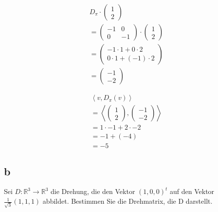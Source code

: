 \begin{align*}
    D_\pi \cdot \begin{pmatrix}
        1 \\ 2
    \end{pmatrix} \\
    = \begin{pmatrix}
        -1 & 0 \\ 0 & -1
    \end{pmatrix} \cdot \begin{pmatrix}
        1 \\ 2
    \end{pmatrix} \\
    = \begin{pmatrix}
        -1 \cdot 1 + 0 \cdot 2 \\ 0 \cdot 1 + (-1) \cdot 2
    \end{pmatrix} \\
    = \begin{pmatrix}
        -1 \\ -2
    \end{pmatrix}
\end{align*}

\begin{align*}
    \left\langle v, D_\pi(v) \right\rangle \\
    = \left\langle \begin{pmatrix}
        1 \\ 2
    \end{pmatrix}, \begin{pmatrix}
        -1 \\ -2
    \end{pmatrix} \right\rangle \\
    = 1 \cdot -1 + 2 \cdot -2 \\
    = -1 + (-4) \\
    = -5
\end{align*}

\subsection{b}
Sei $D : \mathbb{R}^3 \rightarrow \mathbb{R}^3$ die Drehung, die den Vektor $(1, 0, 0)^t$ auf den Vektor 
$\frac{1}{\sqrt{3}}(1, 1, 1)$ abbildet. Bestimmen Sie die Drehmatrix, die D darstellt.

